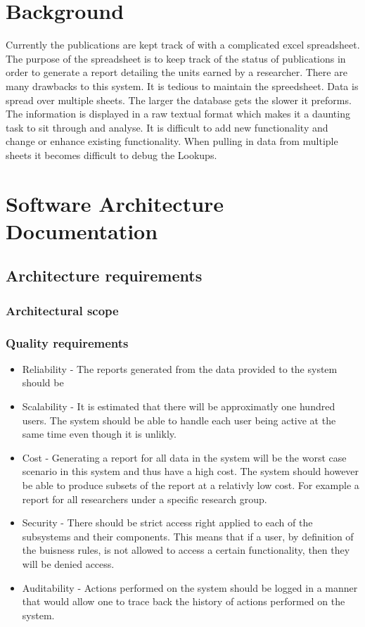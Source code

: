 \documentclass{article}
\begin{document}
	\section{Background}
	Currently the publications are kept track of with a complicated excel spreadsheet. The purpose of the spreadsheet is to keep track of the status of publications in order to generate a report detailing the units earned by a researcher. There are many drawbacks to this system. It is tedious to maintain the spreedsheet. Data is spread over multiple sheets. The larger the database gets the slower it preforms. The information is displayed in a raw textual format which makes it a daunting task to sit through and analyse. It is difficult to add new functionality and change or enhance existing functionality. When pulling in data from multiple sheets it becomes difficult to debug the Lookups.

	\section{Software Architecture Documentation}

		\subsection{Architecture requirements}
			\subsubsection{Architectural scope}

			\subsubsection{Quality requirements}
					\begin{itemize}
					  \item Reliability - The reports generated from the data provided to the system should be
					  \item Scalability - It is estimated that there will be approximatly one hundred users. The system should be able to handle each user being active at the same time even though it is unlikly.
					  \item Cost - Generating a report for all data in the system will be the worst case scenario in this system and thus have a high cost. The system should however be able to produce subsets of the report at a relativly low cost. For example a report for all researchers under a specific research group.
					  \item Security - There should be strict access right applied to each of the subsystems and their components. This means that if a user, by definition of the buisness rules, is not allowed to access a certain functionality, then they will be denied access.
					  \item Auditability - Actions performed on the system should be logged in a manner that would allow one to trace back the history of actions performed on the system.
					\end{itemize}
\end{document}
